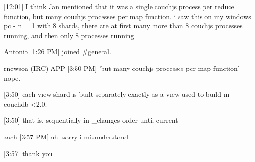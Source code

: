 [12:01]
I think Jan mentioned that it was a single couchjs process per reduce function, but many couchjs processes per map function. i saw this on my windows pc - n = 1 with 8 shards, there are at first many more than 8 couchjs processes running, and then only 8 processes running

Antonio [1:26 PM]
joined \#general.

rnewson (IRC) APP [3:50 PM]
'but many couchjs processes per map function' - nope.

[3:50]
each view shard is built separately exactly as a view used to build in couchdb \textless 2.0.

[3:50]
that is, sequentially in \_changes order until current.

zach [3:57 PM]
oh. sorry i misunderstood.

[3:57]
thank you